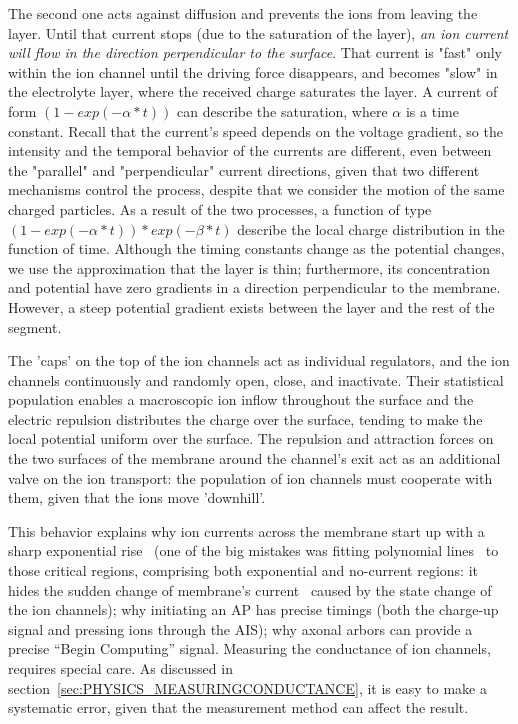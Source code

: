 The second one acts against diffusion and prevents the ions from leaving the layer.
Until that current stops (due to the saturation of the layer),
\textit{an ion current will flow in the direction perpendicular to the surface}.
That current is "fast" only within the ion channel until the driving force disappears,
and becomes "slow" in the electrolyte layer, where the received charge saturates the layer. A current of form $(1-exp(-\alpha *t))$ can describe the saturation, where $\alpha$ is a time constant.
 Recall that the current's speed
depends on the voltage gradient, so the intensity and the temporal behavior of the 
currents are different, even between the "parallel" and "perpendicular" current directions, given that two different mechanisms control the process,
despite that we consider the motion of the same charged particles. As a result of the two processes, a function of type $(1-exp(-\alpha *t))*exp(-\beta *t)$ describe the local charge distribution in the function of time. Although the timing constants change
as the potential changes, we use the approximation that
the layer is thin; furthermore, its concentration and potential have zero gradients in a direction perpendicular to the membrane. However,
a steep potential gradient exists between the layer
and the rest of the segment.



The 'caps' on the top of the ion channels act as
individual regulators, and the ion channels continuously and randomly open, close, and inactivate. Their statistical population enables a
macroscopic ion inflow throughout the surface and the electric repulsion distributes
the charge over the surface, tending to make the local potential uniform over the surface.
The repulsion and attraction forces
on the two surfaces of the membrane around the channel's exit act as an additional valve on the ion transport:
the population 
of ion channels must cooperate with them, given that the ions move 'downhill'.


This behavior explains why ion currents across the membrane
start up with a sharp exponential rise~\cite{SodiumCurrentDelay:2006}
(one of the big mistakes was fitting polynomial lines~\cite{HodgkinHuxley:1952}
to those critical regions, comprising both exponential and no-current regions: it hides the sudden change of membrane's current~\cite{SodiumCurrentDelay:2006}
caused by the state change of the ion channels); why initiating an
\gls{AP} has precise timings (both the charge-up signal and pressing
ions through the \gls{AIS});
why axonal arbors can provide a precise
``Begin Computing'' signal. 
Measuring the conductance of ion channels, requires special care.
As discussed in section~\ref{sec:PHYSICS_MEASURINGCONDUCTANCE}, it is easy to
make a systematic error, given that the measurement method can affect the result. 


